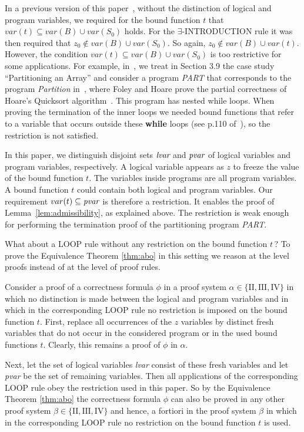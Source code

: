 \documentclass[manuscript, screen, review]{acmart}
\begin{document}
In a previous version of this paper~\cite{ABO25}, 
without the distinction of logical and program variables,
we required for the bound function $t$ that $var(t) \subseteq var(B) \cup var(S_0)$
holds. For the $\exists$-INTRODUCTION rule it was then required that 
$z_0 \not\in var(B) \cup var(S_0)$.
So again,  $z_0 \not\in var(B) \cup var(t)$.
However, the  condition $var(t) \subseteq var(B) \cup var(S_0)$ is too restrictive 
for some applications. For example, in~\cite{ABO09}, we treat in Section 3.9 the case study
``Partitioning an Array'' and consider a program {\it PART} that corresponds to
the program {\it Partition} in~\cite{FH71}, where Foley and Hoare prove the partial correctness
of Hoare's Quicksort algorithm~\cite{Hoa61b}.
This program has nested while loops. When proving the termination of the inner loops we needed
bound functions that refer to a variable that occurs outside these {\bf while} loops
(see p.110 of~\cite{ABO09}), so the restriction is not satisfied.

In this paper, we distinguish disjoint sets $\mbox{\it lvar}$ and $\mbox{\it pvar}$
of logical variables and program variables, respectively.
A logical variable appears as $z$ to freeze the value of the bound function $t$.
The variables inside programs are all program variables.
A bound function $t$ could contain both logical and program variables.
Our requirement $var(t) \subseteq \mbox{\it pvar}$ is therefore a restriction.
It enables the proof of Lemma~\ref{lem:admissibility}, as explained above.
The restriction is weak enough for performing the termination proof
of the partitioning program {\it PART}.

What about a LOOP rule without any restriction on the bound function $t$\,?
To prove the Equivalence Theorem \ref{thm:abo} in this setting we
reason at the level proofs instead of at the level of proof rules.

Consider a proof of a correctness formula $\phi$ in a proof system
$\alpha \in \{\mathrm{II, III, IV}\}$ in which no distinction is made
between the logical and program variables and in which in the
corresponding LOOP rule no restriction is imposed on the bound
function $t$. First, replace all occurrences of the $z$ variables by
distinct fresh variables that do not occur in the considered program
or in the used bound functions $t$. Clearly, this remains a proof of
$\phi$ in $\alpha$.

Next, let the set of logical variables \emph{lvar} consist of these
fresh variables and let \emph{pvar} be the set of remaining variables.
Then all applications of the corresponding LOOP rule obey the
restriction used in this paper. So by the Equivalence Theorem
\ref{thm:abo} the correctness formula $\phi$ can also be proved in any
other proof system $\beta \in \{\mathrm{II, III, IV}\}$ and hence,
a fortiori in the proof system $\beta$ in which in the corresponding
LOOP rule no restriction on the bound function $t$ is used.
\end{document}
